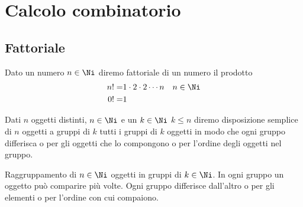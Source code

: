 \chapter{Calcolo combinatorio}\label{ch:calcolo-combinatorio}
\section{Fattoriale}\label{sec:fattoriale}
\begin{defn}\label{defn:Fattoriale-num}
Dato un numero $n\in\Ni$ diremo fattoriale di un numero il prodotto	
\begin{align*}
n!=&1\cdot 2\cdot 2\cdots n&&n\in\Ni\\
0!=&1\\
\end{align*}
\end{defn}
\begin{defn}\label{defn:Diposizioni-semplici}
	Dati $n$ oggetti distinti, $n\in\Ni$ e un $k\in\Ni$ $k\leqslant n$ diremo disposizione semplice di $n$ oggetti a gruppi di $k$ tutti i gruppi di $k$ oggetti in modo che ogni gruppo differisca o per gli oggetti che lo compongono o per l'ordine degli oggetti nel gruppo.
\end{defn}
\begin{defn}\label{defn:Diposizioni-ripetizione}
	Raggruppamento di $n\in\Ni$ oggetti in gruppi di $k\in\Ni$. In ogni gruppo un oggetto può comparire più volte. Ogni gruppo differisce dall'altro o per gli elementi o per l'ordine con cui compaiono. 
\end{defn}